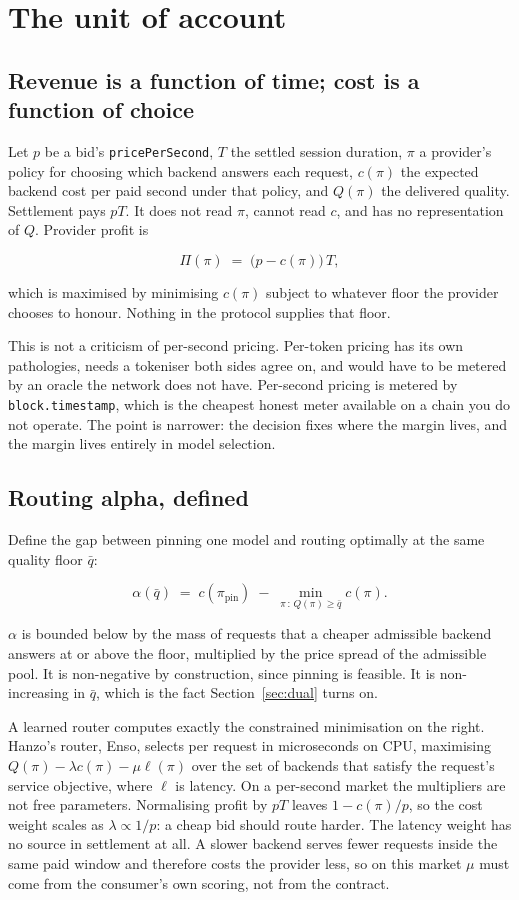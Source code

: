 \documentclass[11pt,a4paper]{article}
\newcommand{\code}[1]{\texttt{\small #1}}
\begin{document}
\section{The unit of account}
\label{sec:unit}

\subsection{Revenue is a function of time; cost is a function of choice}

Let $p$ be a bid's \code{pricePerSecond}, $T$ the settled session duration,
$\pi$ a provider's policy for choosing which backend answers each request,
$c(\pi)$ the expected backend cost per paid second under that policy, and
$Q(\pi)$ the delivered quality. Settlement pays $pT$. It does not read $\pi$,
cannot read $c$, and has no representation of $Q$. Provider profit is

\[
  \Pi(\pi) \;=\; \big(p - c(\pi)\big)\,T ,
\]

\noindent
which is maximised by minimising $c(\pi)$ subject to whatever floor the provider
chooses to honour. Nothing in the protocol supplies that floor.

This is not a criticism of per-second pricing. Per-token pricing has its own
pathologies, needs a tokeniser both sides agree on, and would have to be metered
by an oracle the network does not have. Per-second pricing is metered by
\code{block.timestamp}, which is the cheapest honest meter available on a chain
you do not operate. The point is narrower: the decision fixes where the margin
lives, and the margin lives entirely in model selection.

\subsection{Routing alpha, defined}

Define the gap between pinning one model and routing optimally at the same
quality floor $\bar q$:

\[
  \alpha(\bar q) \;=\; c(\pi_{\mathrm{pin}}) \;-\;
  \min_{\pi \,:\, Q(\pi) \ge \bar q} c(\pi).
\]

\noindent
$\alpha$ is bounded below by the mass of requests that a cheaper admissible
backend answers at or above the floor, multiplied by the price spread of the
admissible pool. It is non-negative by construction, since pinning is feasible.
It is non-increasing in $\bar q$, which is the fact Section~\ref{sec:dual} turns
on.

A learned router computes exactly the constrained minimisation on the right.
Hanzo's router, Enso, selects per request in microseconds on CPU, maximising
$Q(\pi) - \lambda c(\pi) - \mu \ell(\pi)$ over the set of backends that satisfy
the request's service objective, where $\ell$ is latency. On a per-second
market the multipliers are not free parameters. Normalising profit by $pT$
leaves $1 - c(\pi)/p$, so the cost weight scales as $\lambda \propto 1/p$: a
cheap bid should route harder. The latency weight has no source in settlement at
all. A slower backend serves fewer requests inside the same paid window and
therefore costs the provider less, so on this market $\mu$ must come from the
consumer's own scoring, not from the contract.
\end{document}
